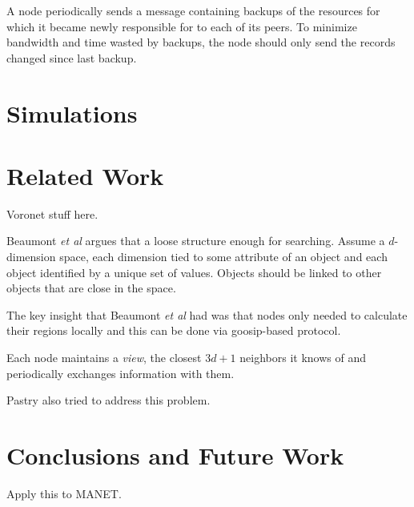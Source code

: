 \documentclass{IEEEtran}
\begin{document}
A node periodically sends a message containing backups of the resources for which it became newly responsible for to each of its peers. To minimize bandwidth and time wasted by backups, the node should only send the records changed since last backup.






\section{Simulations}





\section{Related Work}
Voronet stuff here.


Beaumont \textit{et al} \cite{raynet}  argues that a loose structure enough for searching.  Assume a $d$-dimension space, each dimension tied to some attribute of an object and each object identified by a unique set of values.  Objects should be linked to other objects that are close in the space.
 

The key insight that Beaumont \textit{et al} had  was that nodes only needed to calculate their regions locally and this can be done via goosip-based protocol.

Each node maintains a \textit{view}, the closest $3d+1$ neighbors it knows of and periodically exchanges information with them.


Pastry also tried to address this problem.


\section{Conclusions and Future Work}
Apply this to MANET.




\end{document}
